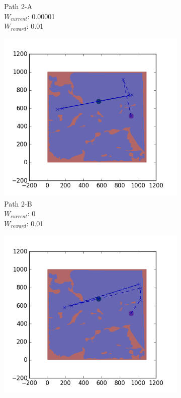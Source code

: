 \documentclass{tamuccthesis}
\begin{document}
\begin{figure}
\begin{subfigure}[b]{0.24\textwidth}
        \caption[]{{\small Path 2-A \\ $W_{current}$: 0.00001 \\ $W_{reward}$: 0.01}}   
        \label{fig:Path_2-A_upReward_Work}
    \end{subfigure}
  \begin{subfigure}[b]{0.24\textwidth}
        \centering
        \includegraphics[width=\textwidth,trim={4cm 3cm 2cm 3cm},clip]{EXP3RG_PathBb_-1_-1_0_0d01.png}
        \caption[]{{\small Path 2-B \\ $W_{current}$: 0 \\ $W_{reward}$: 0.01}}    
        \label{fig:Path_2-B_upReward_noWork}
    \end{subfigure}
    \begin{subfigure}[b]{0.24\textwidth}  
        \centering 
        \includegraphics[width=\textwidth,trim={4cm 3cm 2cm 3cm},clip]{EXP3RG_PathBb_-1_-1_-1_0d01.png}

\end{subfigure}
\end{figure}
\end{document}
